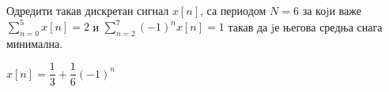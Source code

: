 \PID 
Одредити такав дискретан сигнал $x[n]$, са периодом $N = 6$ за коjи важе
$\sum_{n=0}^{5} x[n] = 2$ и 
$\sum_{n=2}^{7} (-1)^n x[n] = 1$
такав да jе његова средња снага минимална.
\vspace*{2mm}

\textsc{}
$x[n] = \dfrac{1}{3} + \dfrac{1}{6} (-1)^n$